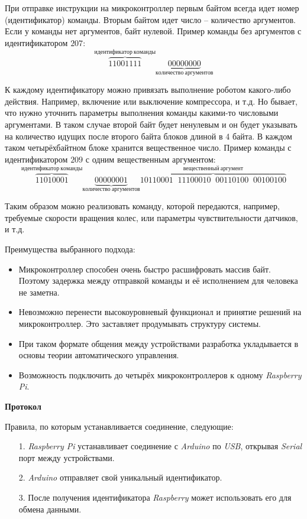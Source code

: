 При отправке инструкции на микроконтроллер первым байтом всегда идет номер (идентификатор) команды. Вторым байтом идет число -- количество аргументов. Если у команды нет аргументов, байт нулевой. Пример команды без аргументов с идентификатором $ 207 $:
\begin{equation*}
    \overbrace{11001111}^{идентификатор\: команды} \underbrace{00000000}_{количество\: аргументов}
\end{equation*}

К каждому идентификатору можно привязать выполнение роботом какого-либо действия. Например, включение или выключение компрессора, и т.д. Но бывает, что нужно уточнить параметры выполнения команды какими-то числовыми аргументами. В таком случае второй байт будет ненулевым и он будет указывать на количество идущих после второго байта блоков длиной в 4 байта. В каждом таком четырёхбайтном блоке хранится вещественное число. Пример команды с идентификатором $ 209 $ с одним вещественным аргументом:
\begin{equation*}
    \overbrace{11010001}^{идентификатор\: команды} \underbrace{00000001}_{количество\: аргументов} \overbrace{10110001 \;\; 11100010 \;\; 00110100 \;\; 00100100}^{вещественный \: аргумент}
\end{equation*}

Таким образом можно реализовать команду, которой передаются, например, требуемые скорости вращения колес, или параметры чувствительности датчиков, и т.д.

Преимущества выбранного подхода:
\begin{itemize}
    \item Микроконтроллер способен очень быстро расшифровать массив байт. Поэтому задержка между отправкой команды и её исполнением для человека не заметна.
    \item Невозможно перенести высокоуровневый функционал и принятие решений на микроконтроллер. Это заставляет продумывать структуру системы.
    \item При таком формате общения между устройствами разработка  укладывается в основы теории автоматического управления.
    \item Возможность подключить до четырёх микроконтроллеров к одному \textit{Raspberry Pi}.
\end{itemize}

\textbf{Протокол}

Правила, по которым устанавливается соединение, следующие:
\begin{itemize}
    \item[1.] \textit{Raspberry Pi} устанавливает соединение с \textit{Arduino} по \textit{USB}, открывая \textit{Serial} порт между устройствами.
    \item[2.] \textit{Arduino} отправляет свой уникальный идентификатор.
    \item[3.] После получения идентификатора \textit{Raspberry} может использовать его для обмена данными. 
\end{itemize}

